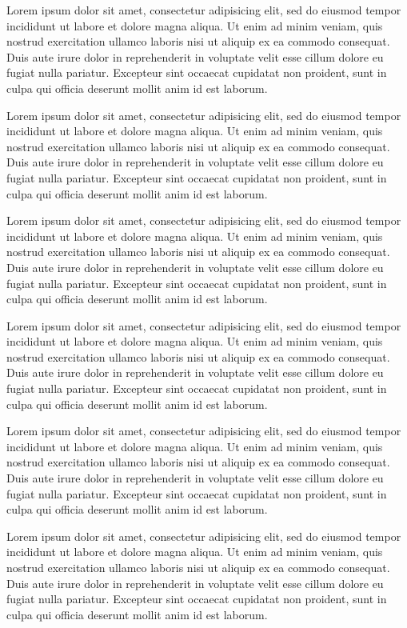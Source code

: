 \documentclass[12pt,a4paper]{letter}
\begin{document}
\begin{letter}
Lorem ipsum dolor sit amet, consectetur adipisicing elit, sed do eiusmod
tempor incididunt ut labore et dolore magna aliqua. Ut enim ad minim veniam,
quis nostrud exercitation ullamco laboris nisi ut aliquip ex ea commodo
consequat. Duis aute irure dolor in reprehenderit in voluptate velit esse
cillum dolore eu fugiat nulla pariatur. Excepteur sint occaecat cupidatat non
proident, sunt in culpa qui officia deserunt mollit anim id est laborum.

Lorem ipsum dolor sit amet, consectetur adipisicing elit, sed do eiusmod
tempor incididunt ut labore et dolore magna aliqua. Ut enim ad minim veniam,
quis nostrud exercitation ullamco laboris nisi ut aliquip ex ea commodo
consequat. Duis aute irure dolor in reprehenderit in voluptate velit esse
cillum dolore eu fugiat nulla pariatur. Excepteur sint occaecat cupidatat non
proident, sunt in culpa qui officia deserunt mollit anim id est laborum.

Lorem ipsum dolor sit amet, consectetur adipisicing elit, sed do eiusmod
tempor incididunt ut labore et dolore magna aliqua. Ut enim ad minim veniam,
quis nostrud exercitation ullamco laboris nisi ut aliquip ex ea commodo
consequat. Duis aute irure dolor in reprehenderit in voluptate velit esse
cillum dolore eu fugiat nulla pariatur. Excepteur sint occaecat cupidatat non
proident, sunt in culpa qui officia deserunt mollit anim id est laborum.

Lorem ipsum dolor sit amet, consectetur adipisicing elit, sed do eiusmod
tempor incididunt ut labore et dolore magna aliqua. Ut enim ad minim veniam,
quis nostrud exercitation ullamco laboris nisi ut aliquip ex ea commodo
consequat. Duis aute irure dolor in reprehenderit in voluptate velit esse
cillum dolore eu fugiat nulla pariatur. Excepteur sint occaecat cupidatat non
proident, sunt in culpa qui officia deserunt mollit anim id est laborum.

Lorem ipsum dolor sit amet, consectetur adipisicing elit, sed do eiusmod
tempor incididunt ut labore et dolore magna aliqua. Ut enim ad minim veniam,
quis nostrud exercitation ullamco laboris nisi ut aliquip ex ea commodo
consequat. Duis aute irure dolor in reprehenderit in voluptate velit esse
cillum dolore eu fugiat nulla pariatur. Excepteur sint occaecat cupidatat non
proident, sunt in culpa qui officia deserunt mollit anim id est laborum.

Lorem ipsum dolor sit amet, consectetur adipisicing elit, sed do eiusmod
tempor incididunt ut labore et dolore magna aliqua. Ut enim ad minim veniam,
quis nostrud exercitation ullamco laboris nisi ut aliquip ex ea commodo
consequat. Duis aute irure dolor in reprehenderit in voluptate velit esse
cillum dolore eu fugiat nulla pariatur. Excepteur sint occaecat cupidatat non
proident, sunt in culpa qui officia deserunt mollit anim id est laborum.


\end{letter}
\end{document}
